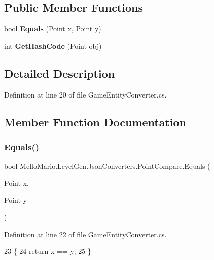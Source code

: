 \subsection*{Public Member Functions}
\begin{DoxyCompactItemize}
\item 
bool \textbf{ Equals} (Point x, Point y)
\item 
int \textbf{ Get\+Hash\+Code} (Point obj)
\end{DoxyCompactItemize}


\subsection{Detailed Description}


Definition at line 20 of file Game\+Entity\+Converter.\+cs.



\subsection{Member Function Documentation}
\mbox{\label{classMelloMario_1_1LevelGen_1_1JsonConverters_1_1PointCompare_a444b7c04eee694349270246e936f7d43}} 
\subsubsection{Equals()}
{\footnotesize\ttfamily bool Mello\+Mario.\+Level\+Gen.\+Json\+Converters.\+Point\+Compare.\+Equals (\begin{DoxyParamCaption}\item[{Point}]{x,  }\item[{Point}]{y }\end{DoxyParamCaption})}



Definition at line 22 of file Game\+Entity\+Converter.\+cs.


\begin{DoxyCode}
23         \{
24             \textcolor{keywordflow}{return} x == y;
25         \}
\end{DoxyCode}
\mbox{\label{classMelloMario_1_1LevelGen_1_1JsonConverters_1_1PointCompare_a629d8cdb4f857669f2a4fa5225716dc3}} 

